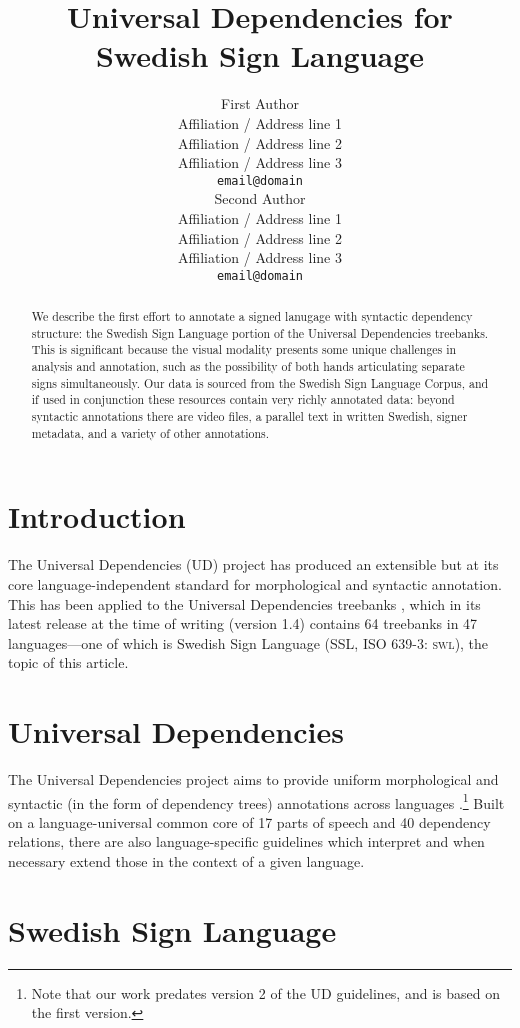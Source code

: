 \documentclass[11pt]{article}
\title{Universal Dependencies for Swedish Sign Language}
\author{First Author \\
  Affiliation / Address line 1 \\
  Affiliation / Address line 2 \\
  Affiliation / Address line 3 \\
  {\tt email@domain} \\\And
  Second Author \\
  Affiliation / Address line 1 \\
  Affiliation / Address line 2 \\
  Affiliation / Address line 3 \\
  {\tt email@domain} \\}
\date{}
\begin{document}
\maketitle
\begin{abstract}
    We describe the first effort to annotate a signed lanugage with syntactic
    dependency structure: the Swedish Sign Language portion of the
    Universal Dependencies treebanks. This is significant because the
    visual modality presents some unique challenges in analysis and
    annotation, such as the possibility of
    both hands articulating separate signs simultaneously.
    Our data is sourced from the Swedish Sign Language Corpus,
    and if used in conjunction these resources contain very richly
    annotated data: beyond syntactic annotations there are video files,
    a parallel text in written Swedish, signer metadata,
    and a variety of other annotations.
\end{abstract}

\section{Introduction}

The Universal Dependencies (UD) project \cite{Nivre2016ud} 
has produced an extensible but at its core language-independent standard for
morphological and syntactic annotation. This has been applied to the Universal
Dependencies treebanks \cite{ud14}, which in its latest release at the time of
writing (version 1.4) contains 64 treebanks in 47 languages---one of which is
Swedish Sign Language (SSL, ISO 639-3: \textsc{swl}), the topic of this
article.


\section{Universal Dependencies}

The Universal Dependencies project aims to provide uniform morphological and
syntactic (in the form of dependency trees) annotations across languages
\cite{Nivre2016ud}.\footnote{Note that our work predates version 2 of the UD
guidelines, and is based on the first version.}
Built on a language-universal common core of 17 parts of speech and
40 dependency relations, there are also language-specific guidelines which
interpret and when necessary extend those in the context of a given language.

\section{Swedish Sign Language}
\end{document}
